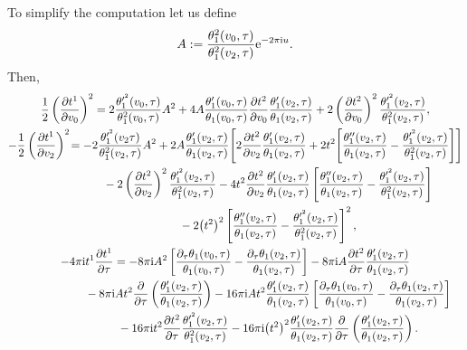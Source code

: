 \documentclass[10pt,a4paper]{amsart}
\numberwithin{equation}{section}
\begin{document}
To simplify the computation let us define
\begin{gather*}
A:=\frac{\theta_1^2(v_0,\tau)}{\theta_1^2(v_2,\tau)}{\rm e}^{-2\pi {\rm i} u}.
\end{gather*}
Then,
\begin{gather*}
\frac{1}{2}\left(\frac{\partial t^1}{\partial v_0}\right)^2 =2\frac{\theta_1^{\prime^2}(v_0,\tau)}{\theta_1^2(v_0,\tau)}A^2 +4A\frac{\theta_1^{\prime}(v_0,\tau)}{\theta_1(v_0,\tau)}
\frac{\partial t^2}{\partial v_0}\frac{\theta_1^{\prime}(v_2,\tau)}{\theta_1(v_2,\tau)} +2\left(\frac{\partial t^2}{\partial v_0}\right)^2\frac{\theta_1^{\prime^2}(v_2,\tau)}{\theta_1^2(v_2,\tau)},
\\
-\frac{1}{2}\left(\frac{\partial t^1}{\partial v_2}\right)^2\! =-2\frac{\theta_1^{\prime^2}(v_2\tau)}{\theta_1^2(v_2,\tau)}A^2
+2A\frac{\theta_1^{\prime}(v_2,\tau)}{\theta_1(v_2,\tau)}\! \left[2\frac{\partial t^2}{\partial v_2}\frac{\theta_1^{\prime}(v_2,\tau)}{\theta_1(v_2,\tau)} +2t^2\!\left[\frac{\theta_1^{\prime\prime}(v_2,\tau)}{\theta_1(v_2,\tau)} -\frac{\theta_1^{\prime^2}(v_2,\tau)}{\theta_1^2(v_2,\tau)}\right]\right]
\\ \hphantom{\frac{1}{2}\left(\frac{\partial t^1}{\partial v_0}\right)^2 =}
-2\left(\frac{\partial t^2}{\partial v_2}\right)^2 \frac{\theta_1^{\prime^2}(v_2,\tau)}{\theta_1^2(v_2,\tau)} -4t^2\frac{\partial t^2}{\partial v_2}\frac{\theta_1^{\prime}(v_2,\tau)}{\theta_1(v_2,\tau)} \left[\frac{\theta_1^{\prime\prime}(v_2,\tau)}{\theta_1(v_2,\tau)} -\frac{\theta_1^{\prime^2}(v_2,\tau)}{\theta_1^2(v_2,\tau)}\right]
\\ \hphantom{\frac{1}{2}\left(\frac{\partial t^1}{\partial v_0}\right)^2 =}
-2\big(t^2\big)^2\left[\frac{\theta_1^{\prime\prime}(v_2,\tau)}{\theta_1(v_2,\tau)} -\frac{\theta_1^{\prime^2}(v_2,\tau)}{\theta_1^2(v_2,\tau)}\right]^2,
\\
-4\pi {\rm i}t^1\frac{\partial t^1}{\partial \tau}=-8\pi {\rm i}A^2\left[\frac{\partial_{\tau}\theta_1(v_0,\tau)}{\theta_1(v_0,\tau)} -\frac{\partial_{\tau}\theta_1(v_2,\tau)}{\theta_1(v_2,\tau)}\right]
-8\pi {\rm i}A\frac{\partial t^2}{\partial \tau}\frac{\theta_1^{\prime}(v_2,\tau)}{\theta_1(v_2,\tau)}
\\ \hphantom{-4\pi {\rm i}t^1\frac{\partial t^1}{\partial \tau}=}
{}-8\pi {\rm i}At^2\frac{\partial}{\partial \tau}\left(\frac{\theta_1^{\prime}(v_2,\tau)}{\theta_1(v_2,\tau)}\right)-16\pi {\rm i}A t^2\frac{\theta_1^{\prime}(v_2,\tau)}{\theta_1(v_2,\tau)} \left[\frac{\partial_{\tau}\theta_1(v_0,\tau)}{\theta_1(v_0,\tau)} {}-\frac{\partial_{\tau}\theta_1(v_2,\tau)}{\theta_1(v_2,\tau)}\right]
\\ \hphantom{-4\pi {\rm i}t^1\frac{\partial t^1}{\partial \tau}=}
-16\pi {\rm i}t^2\frac{\partial t^2}{\partial \tau}\frac{\theta_1^{\prime^2}(v_2,\tau)}{\theta_1^2(v_2,\tau)}-16\pi {\rm i}\big(t^2\big)^2\frac{\theta_1^{\prime}(v_2,\tau)}{\theta_1(v_2,\tau)}\frac{\partial}{\partial \tau}\left(\frac{\theta_1^{\prime}(v_2,\tau)}{\theta_1(v_2,\tau)}\right).
\end{gather*}
\end{document}
